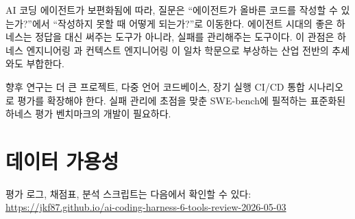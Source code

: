 \documentclass[11pt,a4paper]{article}
\begin{document}
\noindent AI 코딩 에이전트가 보편화됨에 따라, 질문은 ``에이전트가 올바른 코드를 작성할 수 있는가?''에서 ``작성하지 못할 때 어떻게 되는가?''로 이동한다.
에이전트 시대의 좋은 하네스는 정답을 대신 써주는 도구가 아니라, 실패를 관리해주는 도구이다.
이 관점은 하네스 엔지니어링 \cite{atlan2026harness}과 컨텍스트 엔지니어링 \cite{karpathy2025context}이 일차 학문으로 부상하는 산업 전반의 추세와도 부합한다.

향후 연구는 더 큰 프로젝트, 다중 언어 코드베이스, 장기 실행 CI/CD 통합 시나리오로 평가를 확장해야 한다.
실패 관리에 초점을 맞춘 SWE-bench에 필적하는 표준화된 하네스 평가 벤치마크의 개발이 필요하다.

\section*{데이터 가용성}

평가 로그, 채점표, 분석 스크립트는 다음에서 확인할 수 있다:
\url{https://jkf87.github.io/ai-coding-harness-6-tools-review-2026-05-03}



\end{document}
